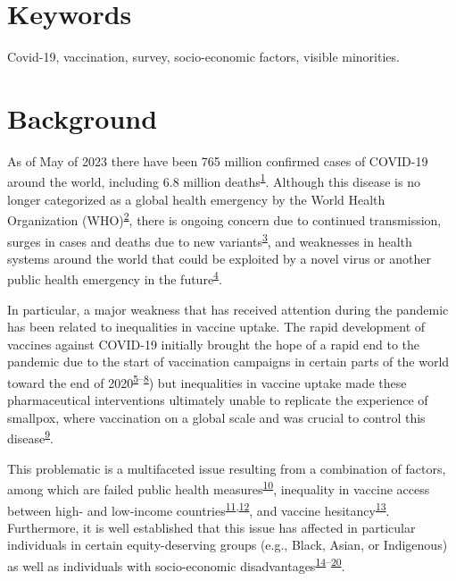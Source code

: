 \documentclass[
  letterpaper,
  DIV=11,
  numbers=noendperiod]{scrartcl}
\begin{document}
\hypertarget{keywords}{%
\section*{Keywords}\label{keywords}}

Covid-19, vaccination, survey, socio-economic factors, visible
minorities.

\hypertarget{background}{%
\section{Background}\label{background}}

As of May of 2023 there have been 765 million confirmed cases of
COVID-19 around the world, including 6.8 million
deaths\textsuperscript{\protect\hyperlink{ref-WHO-Covid}{1}}. Although
this disease is no longer categorized as a global health emergency by
the World Health Organization
(WHO)\textsuperscript{\protect\hyperlink{ref-rigby2023}{2}}, there is
ongoing concern due to continued transmission, surges in cases and
deaths due to new
variants\textsuperscript{\protect\hyperlink{ref-un2023}{3}}, and
weaknesses in health systems around the world that could be exploited by
a novel virus or another public health emergency in the
future\textsuperscript{\protect\hyperlink{ref-mackey2021}{4}}.

In particular, a major weakness that has received attention during the
pandemic has been related to inequalities in vaccine uptake. The rapid
development of vaccines against COVID-19 initially brought the hope of a
rapid end to the pandemic due to the start of vaccination campaigns in
certain parts of the world toward the end of
2020\textsuperscript{\protect\hyperlink{ref-thelancet2021}{5}--\protect\hyperlink{ref-tanne2020}{8}})
but inequalities in vaccine uptake made these pharmaceutical
interventions ultimately unable to replicate the experience of smallpox,
where vaccination on a global scale and was crucial to control this
disease\textsuperscript{\protect\hyperlink{ref-kayser2021}{9}}.

This problematic is a multifaceted issue resulting from a combination of
factors, among which are failed public health
measures\textsuperscript{\protect\hyperlink{ref-li2021}{10}}, inequality
in vaccine access between high- and low-income
countries\textsuperscript{\protect\hyperlink{ref-gerretsen2021}{11},\protect\hyperlink{ref-tamey2022}{12}},
and vaccine
hesitancy\textsuperscript{\protect\hyperlink{ref-nafilyan2021}{13}}.
Furthermore, it is well established that this issue has affected in
particular individuals in certain equity-deserving groups (e.g., Black,
Asian, or Indigenous) as well as individuals with socio-economic
disadvantages\textsuperscript{\protect\hyperlink{ref-willis2021}{14}--\protect\hyperlink{ref-hussain2022}{20}}.
\end{document}
